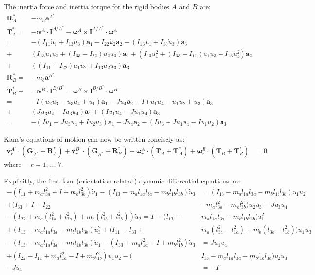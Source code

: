 \documentclass[letterpaper,11pt]{article}
\newcommand{\bs}[1]{ \boldsymbol{ #1 } }
\begin{document}
The inertia force and inertia torque for the rigid bodies $A$ and $B$ are:
\begin{align*}
  \bs{R}^*_A  =& -m_a \bs{a}^{A^*} \\
  \bs{T}^*_A  =& -\bs{\alpha}^A \cdot \bs{I}^{A/A^*} - \bs{\omega}^A \times
  \bs{I}^{A/A^*} \cdot \bs{\omega}^A \\
  = &-(I_{11}\dot{u}_1 + I_{13}\dot{u}_3)\bs{a}_1 - I_{22}\dot{u}_2\bs{a}_2 -
  (I_{13}\dot{u}_1 + I_{33}\dot{u}_3)\bs{a}_3 \\
   + & (I_{13}u_1u_2 + (I_{33} - I_{22})u_2u_3)\bs{a}_1 +
  (I_{13}u_1^2 + (I_{33}- I_{11})u_1u_3 - I_{13}u_3^2)\bs{a}_2 \\
  + & ((I_{11} - I_{22})u_1u_2 + I_{13}u_2u_3)\bs{a}_3 \\
  \bs{R}^*_B = & -m_b \bs{a}^{B^*} \\
  \bs{T}^*_B = & -\bs{\alpha}^B \cdot \bs{I}^{B/B^*} - \bs{\omega}^B \times
  \bs{I}^{B/B^*} \cdot \bs{\omega}^B \\
  = & -I(u_2u_3 - u_3u_4 + \dot{u}_1)\bs{a}_1 - J\dot{u}_4\bs{a}_2 - I(u_1u_4 - u_1u_2 +
  \dot{u}_3)\bs{a}_3 \\
  + & (Ju_3u_4 - Iu_3u_4)\bs{a}_1 + (Iu_1u_4 - Ju_1u_4)\bs{a}_3 \\
  = &-(I\dot{u}_1 - Ju_3u_4 + Iu_2u_3)\bs{a}_1 - J\dot{u}_4\bs{a}_2 -
  (I\dot{u}_3 + Ju_1u_4 - Iu_1u_2)\bs{a}_3
\end{align*}

Kane's equations of motion can now be written concisely as:
\begin{align*}
  \bs{v}^{A^*}_r \cdot (\bs{G}_{A^*} + \bs{R}^*_A) +
  \bs{v}^{B^*}_r \cdot (\bs{G}_{B^*} + \bs{R}^*_B) +
  \bs{\omega}^A_r \cdot (\bs{T}_A + \bs{T}^*_A) +
  \bs{\omega}^B_r \cdot (\bs{T}_B + \bs{T}^*_B) & = 0
\end{align*}
where $\quad r = 1,\dots,7$.

Explicitly, the first four (orientation related) dynamic differential equations are:
\begin{align*}
  -\left(I_{11} + m_al_{3a}^2 + I + m_bl_{3b}^2\right)\dot{u}_{1}
  - \left(I_{13} - m_al_{1a}l_{3a} - m_bl_{1b}l_{3b}\right)\dot{u}_{3}
  & =
  (I_{13}  - m_al_{1a}l_{3a} - m_bl_{1b}l_{3b})u_1u_2\\
  + (I_{33} + I - I_{22}& - m_al_{3a}^2 - m_bl_{3b}^2)u_2u_3 - Ju_3u_4
  \\
-(I_{22} + m_a(l_{1a}^2 + l_{3a}^2) + m_b(l_{1b}^2 + l_{3b}^2)) \dot{u}_2
  =
  T
  -(I_{13} - &m_al_{1a}l_{3a} - m_bl_{1b}l_{3b})u_1^2 \\
  + (I_{13} - m_al_{1a}l_{3a} - m_bl_{1b}l_{3b})u_3^2
  + (I_{11} - I_{33} + &m_a(l_{3a}^2 - l_{1a}^2)
  + m_b(l_{3b} - l_{1b}^2))u_1u_3
  \\
  -(I_{13} - m_al_{1a}l_{3a} - m_bl_{1b}l_{3b}) \dot{u}_1 - (I_{33} +
  m_al_{1a}^2 + I + m_bl_{1b}^2) \dot{u}_3
  & = Ju_1u_4
  \\
  + (I_{22} - I_{11} + m_al_{1a}^2 - I + m_bl_{1b}^2)u_1u_2 -
  (&I_{13} - m_al_{1a}l_{3a} - m_bl_{1b}l_{3b})u_2u_3
  \\
  -J\dot{u}_4 &=  -T
\end{align*}
\end{document}

